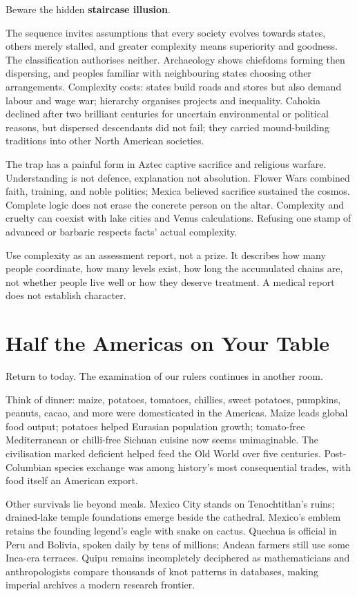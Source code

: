Beware the hidden \textbf{staircase illusion}.

The sequence invites assumptions that every society evolves towards states, others merely stalled, and greater complexity means superiority and goodness. The classification authorises neither. Archaeology shows chiefdoms forming then dispersing, and peoples familiar with neighbouring states choosing other arrangements. Complexity costs: states build roads and stores but also demand labour and wage war; hierarchy organises projects and inequality. Cahokia declined after two brilliant centuries for uncertain environmental or political reasons, but dispersed descendants did not fail; they carried mound-building traditions into other North American societies.

The trap has a painful form in Aztec captive sacrifice and religious warfare. Understanding is not defence, explanation not absolution. Flower Wars combined faith, training, and noble politics; Mexica believed sacrifice sustained the cosmos. Complete logic does not erase the concrete person on the altar. Complexity and cruelty can coexist with lake cities and Venus calculations. Refusing one stamp of advanced or barbaric respects facts' actual complexity.

Use complexity as an assessment report, not a prize. It describes how many people coordinate, how many levels exist, how long the accumulated chains are, not whether people live well or how they deserve treatment. A medical report does not establish character.

\section{Half the Americas on Your Table}
Return to today. The examination of our rulers continues in another room.

Think of dinner: maize, potatoes, tomatoes, chillies, sweet potatoes, pumpkins, peanuts, cacao, and more were domesticated in the Americas. Maize leads global food output; potatoes helped Eurasian population growth; tomato-free Mediterranean or chilli-free Sichuan cuisine now seems unimaginable. The civilisation marked deficient helped feed the Old World over five centuries. Post-Columbian species exchange was among history's most consequential trades, with food itself an American export.

Other survivals lie beyond meals. Mexico City stands on Tenochtitlan's ruins; drained-lake temple foundations emerge beside the cathedral. Mexico's emblem retains the founding legend's eagle with snake on cactus. Quechua is official in Peru and Bolivia, spoken daily by tens of millions; Andean farmers still use some Inca-era terraces. Quipu remains incompletely deciphered as mathematicians and anthropologists compare thousands of knot patterns in databases, making imperial archives a modern research frontier.


